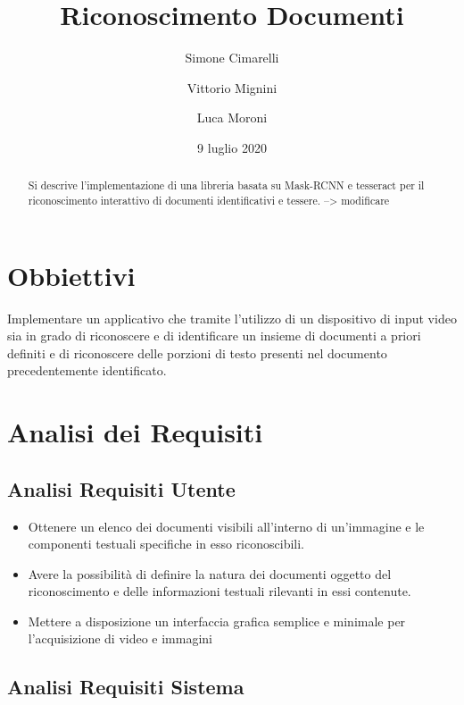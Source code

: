 \documentclass[12pt,a4paper]{article}
\begin{document}
\title{Riconoscimento Documenti}
\author{Simone Cimarelli \and Vittorio Mignini \and Luca Moroni}
\date{9 luglio 2020}

\maketitle

\begin{abstract}
    Si descrive l'implementazione di una libreria basata su Mask-RCNN e
    tesseract per il riconoscimento interattivo di documenti
    identificativi e tessere.
    --> modificare %
\end{abstract}

\section{Obbiettivi}

Implementare un applicativo che tramite l'utilizzo di un dispositivo di
input video sia in grado di riconoscere e di identificare un insieme di
documenti a priori definiti e di riconoscere delle porzioni di testo
presenti nel documento precedentemente identificato.

\section{Analisi dei Requisiti}
\subsection{Analisi Requisiti Utente}

\begin{itemize}
    \item Ottenere un elenco dei documenti visibili all'interno di
        un'immagine e le componenti testuali specifiche in esso
        riconoscibili.
    \item Avere la possibilità di definire la natura dei documenti
        oggetto del riconoscimento e delle informazioni testuali
        rilevanti in essi contenute.
    \item Mettere a disposizione un interfaccia grafica semplice e
        minimale per l'acquisizione di video e immagini
\end{itemize}

\subsection{Analisi Requisiti Sistema}
\end{document}
